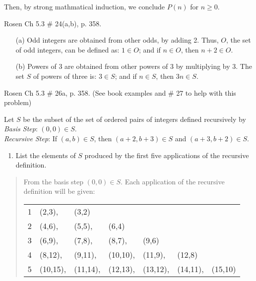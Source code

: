 \begin{questions}
\begin{solution}
  Then, by strong mathmatical induction, we conclude $P(n)$ for $n \geq 0$.
\end{solution}


 Rosen Ch 5.3 \# 24(a,b), p. 358.
    \ifprintanswers
        \vspace{-10pt}
   \fi
\begin{solution}
  \begin{itemize}
    \item[(a)] Odd integers are obtained from other odds, by adding 2. Thus, $O$, the set of odd integers, can be defined as:  $1 \in O$;  and if $n \in O$, then $n+2  \in O$.
    \item[(b)] Powers of 3 are obtained from other powers of 3 by multiplying by 3.  The set $S$ of powers of three is:  $3 \in S$; and if $n \in S$, then $3n \in S$.
  \end{itemize}
\end{solution}

 Rosen Ch 5.3 \# 26a, p. 358. (See book examples and \#
27 to help with this problem)
\begin{solution}
Let $S$ be the subset of the set of ordered pairs of integers defined recursively by \\
\textit{Basis Step}: $(0,0) \in S$. \\
\textit{Recursive Step}: If $(a,b) \in S$, then $(a+2,b+3)\in S$ and $(a+3,b+2) \in S$. \\
\begin{enumerate}
    \item List the elements of $S$ produced by the first five applications of the recursive definition.
\end{enumerate}
\begin{quote}
    From the basis step $(0,0) \in S$.  Each application of the recursive definition will be given:

    \begin{tabular}{rllllll}
    1 & (2,3), & (3,2) \\
    2 & (4,6), & (5,5), & (6,4) \\
    3 & (6,9), & (7,8), & (8,7), & (9,6) \\
    4 & (8,12), & (9,11), & (10,10), & (11,9), & (12,8) \\
    5 & (10,15), & (11,14), & (12,13), & (13,12), & (14,11), & (15,10) \\
    \end{tabular}
\end{quote}
\end{solution}

\end{questions}
